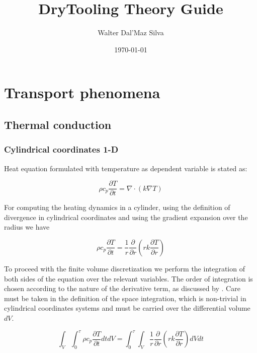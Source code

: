 \documentclass[oneside]{textbook}
\title{DryTooling Theory Guide}
\author{Walter Dal'Maz Silva}
\date{\today}
\begin{document}
\maketitle%

\tableofcontents%


\part{Transport phenomena}

\chapter{\label{ch:thermal-conduction}Thermal conduction}%

\section{Cylindrical coordinates 1-D}

Heat equation formulated with temperature as dependent variable is stated as:

\begin{equation}
\rho{}c_{p}\frac{\partial{}T}{\partial{}t}=\nabla\cdotp{}(k\nabla{}T)
\end{equation}

For computing the heating dynamics in a cylinder, using the definition of divergence in cylindrical coordinates and using the gradient expansion over the radius we have

\begin{equation}
\rho{}c_{p}\frac{\partial{}T}{\partial{}t}=
\frac{1}{r}\frac{\partial}{\partial{}r}
\left(rk\frac{\partial{}T}{\partial{}r}\right)
\end{equation}

To proceed with the finite volume discretization we perform the integration of both sides of the equation over the relevant variables. The order of integration is chosen according to the nature of the derivative term, as discussed by \textcite{Patankar1980}. Care must be taken in the definition of the space integration, which is non-trivial in cylindrical coordinates systems and must be carried over the differential volume $dV$.

\begin{equation}
\int_{V}\int_{0}^{\tau}
\rho{}c_{p}\frac{\partial{}T}{\partial{}t}dtdV=
\int_{0}^{\tau}\int_{V}
\frac{1}{r}\frac{\partial}{\partial{}r}
\left(rk\frac{\partial{}T}{\partial{}r}\right)dVdt
\end{equation}
\end{document}
